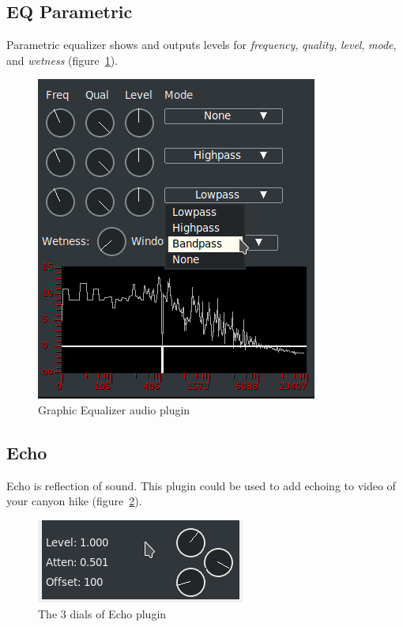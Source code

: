 \subsection{EQ Parametric}%
\label{sub:eq_parametric}

Parametric equalizer shows and outputs levels for \textit{frequency}, \textit{quality}, \textit{level}, \textit{mode}, and \textit{wetness} (figure~\ref{fig:eq_param}).

\begin{figure}[htpb]
	\centering
	\includegraphics[width=0.4\linewidth]{images/eq_param.png}
	\caption{Graphic Equalizer audio plugin}
	\label{fig:eq_param}
\end{figure}

\subsection{Echo}%
\label{sub:echo}

Echo is reflection of sound. This plugin could be used to add echoing to video of your canyon hike (figure~\ref{fig:echo}).

\begin{figure}[htpb]
    \centering
    \includegraphics[width=0.4\linewidth]{images/echo.png}
    \caption{The 3 dials of Echo plugin}
    \label{fig:echo}
\end{figure}

